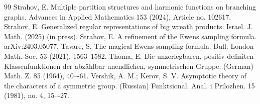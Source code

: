 \documentclass[12pt]{amsart}
\theoremstyle{definition}
\numberwithin{equation}{section}
\begin{document}
\begin{thebibliography}{99}
 Strahov, E. Multiple partition structures and harmonic functions on branching graphs.
Advances in Applied Mathematics 153 (2024), Article no. 102617.
 Strahov, E. Generalized regular representations of big wreath products. Israel. J. Math. (2025)
 (in press).
 Strahov, E. A refinement of the Ewens sampling formula. arXiv:2403.05077.
  Tavar$\acute{\mbox{e}}$, S.  The magical Ewens sampling formula.
Bull. London Math. Soc. 53 (2021), 1563--1582.
Thoma, E. Die unzerlegbaren, positiv-definiten Klassenfunktionen der abzählbar unendlichen, symmetrischen Gruppe. (German) Math. Z. 85 (1964), 40–-61.
 Vershik, A. M.; Kerov, S. V. Asymptotic theory of the characters of a symmetric group. (Russian) Funktsional. Anal. i Prilozhen. 15 (1981), no. 4, 15–-27.
\end{thebibliography}
\end{document}
